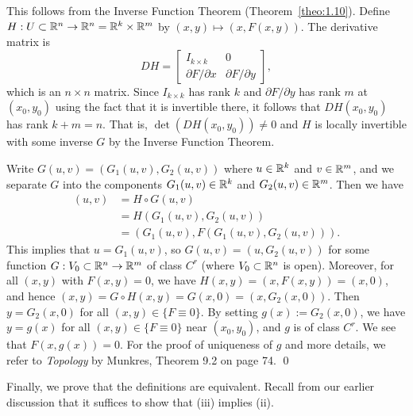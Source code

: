 \begin{pf}
    This follows from the Inverse Function Theorem (Theorem~\ref{theo:1.10}).
    Define $H : U \subset \mathbb{R}^n \to \mathbb{R}^n = \mathbb{R}^k \times \mathbb{R}^m$ by $(x, y) 
    \mapsto (x, F(x, y))$. The derivative matrix is
    \[ DH = \left[ \begin{array}{c|c}
        I_{k\times k} & 0 \\ \hline
        \partial F/\partial x & \partial F/\partial y
    \end{array} \right], \]
    which is an $n \times n$ matrix. 
    Since $I_{k\times k}$ has rank $k$ and $\partial F/\partial y$ has 
    rank $m$ at $(x_0, y_0)$ using the fact that it is invertible there, 
    it follows that $DH(x_0, y_0)$ has rank $k + m = n$. That is, 
    $\det(DH(x_0, y_0)) \neq 0$ and $H$ is locally invertible with 
    some inverse $G$ by the Inverse Function Theorem.

    Write $G(u, v) = (G_1(u, v), G_2(u, v))$ where $u \in \mathbb{R}^k$ and
    $v \in \mathbb{R}^m$, and we separate $G$ into the components $G_1(u, v) \in \mathbb{R}^k$ and 
    $G_2(u, v) \in \mathbb{R}^m$. Then we have 
    \begin{align*}
        (u, v) &= H \circ G(u, v) \\ 
        &= H(G_1(u, v), G_2(u, v)) \\ 
        &= (G_1(u, v), F(G_1(u, v), G_2(u, v))). 
    \end{align*}
    This implies that $u = G_1(u, v)$, so $G(u, v) = (u, G_2(u, v))$ for some 
    function $G : V_0 \subset \mathbb{R}^n \to \mathbb{R}^m$ of class $C^r$ (where $V_0 
    \subset \mathbb{R}^n$ is open). Moreover, for all $(x, y)$ with $F(x, y) = 0$, 
    we have $H(x, y) = (x, F(x, y)) = (x, 0)$,
    and hence $(x, y) = G \circ H(x, y) = G(x, 0) = (x, G_2(x, 0))$. Then 
    $y = G_2(x, 0)$ for all $(x, y) \in \{F \equiv 0\}$. By setting 
    $g(x) := G_2(x, 0)$, we have $y = g(x)$ for all $(x, y) \in \{F \equiv 0\}$
    near $(x_0, y_0)$, and $g$ is of class $C^r$. We see that 
    $F(x, g(x)) = 0$.
    For the proof of uniqueness of $g$ and more details, we refer to 
    \emph{Topology} by Munkres, Theorem 9.2 on page 74. \qed 
\end{pf}\vspace{-0.25cm} 

Finally, we prove that the definitions are equivalent. Recall from 
our earlier discussion that it suffices to show that (iii) implies (ii). 

